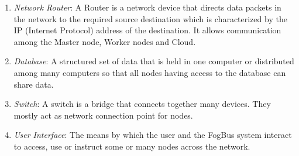 \documentclass[AMA,STIX1COL]{WileyNJD-v2}
\begin{document}
\begin{enumerate}
\item \textit{Network Router}: A Router is a network device that directs data packets in the network to the required source destination which is characterized by the IP (Internet Protocol) address of the destination. It allows communication among the Master node, Worker nodes and Cloud.
\item \textit{Database}: A structured set of data that is held in one computer or distributed among many computers so that all nodes having access to the database can share data.
\item \textit{Switch}: A switch is a bridge that connects together many devices. They mostly act as network connection point for nodes.
\item \textit{User Interface}: The means by which the user and the FogBus system interact to access, use or instruct some or many nodes across the network. 
\end{enumerate}
\end{document}
